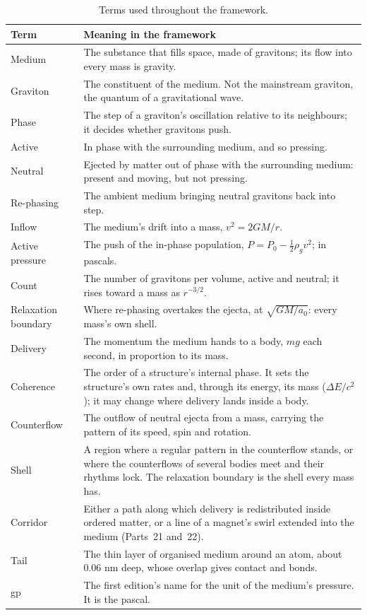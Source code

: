 \documentclass[11pt,a4paper]{article}
\begin{document}
\begin{table}[H]
\centering
\small
\renewcommand{\arraystretch}{1.2}
\begin{tabular}{@{}>{\raggedright\arraybackslash}p{}>{\raggedright\arraybackslash}p{}@{}}
\toprule
\textbf{Term} & \textbf{Meaning in the framework} \\
\midrule
Medium & The substance that fills space, made of gravitons; its flow into every mass is gravity. \\
Graviton & The constituent of the medium. Not the mainstream graviton, the quantum of a gravitational wave. \\
Phase & The step of a graviton's oscillation relative to its neighbours; it decides whether gravitons push. \\
Active & In phase with the surrounding medium, and so pressing. \\
Neutral & Ejected by matter out of phase with the surrounding medium: present and moving, but not pressing. \\
Re-phasing & The ambient medium bringing neutral gravitons back into step. \\
Inflow & The medium's drift into a mass, $v^2 = 2GM/r$. \\
Active pressure & The push of the in-phase population, $P = P_0 - \tfrac12\rho_g v^2$; in pascals. \\
Count & The number of gravitons per volume, active and neutral; it rises toward a mass as $r^{-3/2}$. \\
Relaxation boundary & Where re-phasing overtakes the ejecta, at $\sqrt{GM/a_0}$: every mass's own shell. \\
Delivery & The momentum the medium hands to a body, $mg$ each second, in proportion to its mass. \\
Coherence & The order of a structure's internal phase. It sets the structure's own rates and, through its energy, its mass ($\Delta E/c^2$); it may change where delivery lands inside a body. \\
Counterflow & The outflow of neutral ejecta from a mass, carrying the pattern of its speed, spin and rotation. \\
Shell & A region where a regular pattern in the counterflow stands, or where the counterflows of several bodies meet and their rhythms lock. The relaxation boundary is the shell every mass has. \\
Corridor & Either a path along which delivery is redistributed inside ordered matter, or a line of a magnet's swirl extended into the medium (Parts~21 and~22). \\
Tail & The thin layer of organised medium around an atom, about 0.06 nm deep, whose overlap gives contact and bonds. \\
gp & The first edition's name for the unit of the medium's pressure. It is the pascal. \\
\bottomrule
\end{tabular}
\caption{Terms used throughout the framework.}
\label{tab:glossary}
\end{table}
\end{document}

